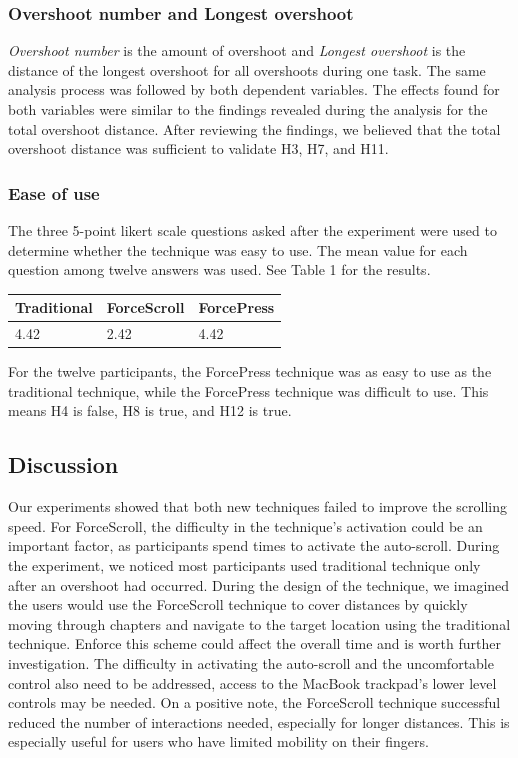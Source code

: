 \documentclass{sigchi}
\begin{document}
\subsubsection{Overshoot number and Longest overshoot}
\textit{Overshoot number} is the amount of overshoot and \textit{Longest overshoot} is the distance of the longest overshoot for all overshoots during one task. The same analysis process was followed by both dependent variables. The effects found for both variables were similar to the findings revealed during the analysis for the total overshoot distance. After reviewing the findings, we believed that the total overshoot distance was sufficient to validate H3, H7, and H11.    

\subsubsection{Ease of use}
The three 5-point likert scale questions asked after the experiment were used to determine whether the technique was easy to use. The mean value for each question among twelve answers was used. See Table 1 for the results.

\begin{table}[h]
    \begin{tabular}{|l|l|l|}
        \hline
        Traditional & ForceScroll & ForcePress \\ \hline
        4.42        & 2.42        & 4.42       \\ \hline
    \end{tabular}
\end{table}

For the twelve participants, the ForcePress technique was as easy to use as the traditional technique, while the ForcePress technique was difficult to use. This means H4 is false, H8 is true, and H12 is true.

\subsection{Discussion}
Our experiments showed that both new techniques failed to improve the scrolling speed. For ForceScroll, the difficulty in the technique's activation could be an important factor, as participants spend times to activate the auto-scroll. During the experiment, we noticed most participants used traditional technique only after an overshoot had occurred. During the design of the technique, we imagined the users would use the ForceScroll technique to cover distances by quickly moving through chapters and navigate to the target location using the traditional technique. Enforce this scheme could affect the overall time and is worth further investigation. The difficulty in activating the auto-scroll and the uncomfortable control also need to be addressed, access to the MacBook trackpad's lower level controls may be needed. On a positive note, the ForceScroll technique successful reduced the number of interactions needed, especially for longer distances. This is especially useful for users who have limited mobility on their fingers.
\end{document}

